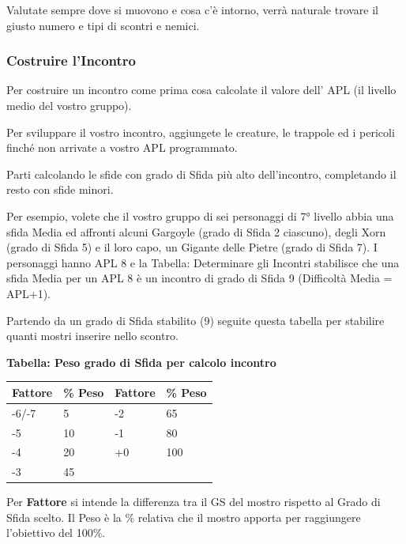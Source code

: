 \begin{multicols}{2}
Valutate sempre dove si muovono e cosa c'è intorno, verrà naturale trovare il giusto numero e tipi di scontri e nemici.

\subsubsection{Costruire l'Incontro}\label{costruireincontro}

Per costruire un incontro come prima cosa calcolate il valore dell' APL (il livello medio del vostro gruppo).

Per sviluppare il vostro incontro, aggiungete le creature, le trappole ed i pericoli finché non arrivate a vostro APL programmato.

Parti calcolando le sfide con grado di Sfida più alto dell'incontro, completando il resto con sfide minori.

Per esempio, volete che il vostro gruppo di sei personaggi di 7° livello abbia una sfida Media ed affronti alcuni Gargoyle (grado di Sfida 2 ciascuno), degli Xorn (grado di Sfida 5) e il loro capo, un Gigante delle Pietre (grado di Sfida 7). I personaggi hanno APL 8 e la Tabella: Determinare gli Incontri stabilisce che una sfida Media per un APL 8 è un incontro di grado di Sfida 9 (Difficoltà Media = APL+1).

Partendo da un grado di Sfida stabilito (9) seguite questa tabella per stabilire quanti mostri inserire nello scontro.

\medskip

\textbf{Tabella: Peso grado di Sfida per calcolo incontro}

\medskip

\noindent\begin{tabular}{l|l||l|l|}
\textbf{Fattore} & \textbf{\% Peso} &\textbf{Fattore} & \textbf{\% Peso}\\
\toprule
-6/-7& 5  & -2 & 65 \\
-5& 10    & -1 & 80 \\
-4& 20    & +0 & 100\\
-3& 45    &    & \\
\end{tabular}

\medskip

Per \textbf{Fattore} si intende la differenza tra il GS del mostro rispetto al Grado di Sfida scelto. Il Peso è la \% relativa che il mostro apporta per raggiungere l'obiettivo del 100\%.


\end{multicols}
